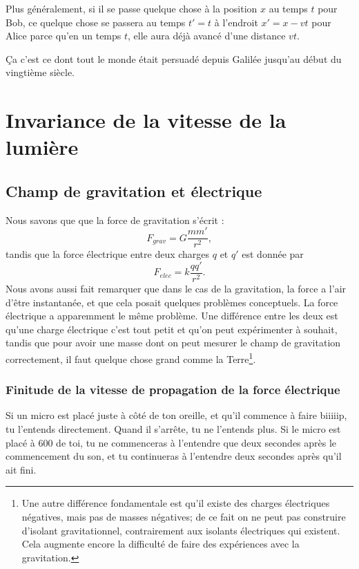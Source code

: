 Plus généralement, si il se passe quelque chose à la position \( x\) au temps \( t\) pour Bob, ce quelque chose se passera au temps \( t'=t\) à l'endroit \( x'=x-vt\) pour Alice parce qu'en un temps \( t\), elle aura déjà avancé d'une distance \( vt\).

Ça c'est ce dont tout le monde était persuadé depuis Galilée jusqu'au début du vingtième siècle.

%
\section{Invariance de la vitesse de la lumière}
%

\subsection{Champ de gravitation et électrique}

Nous savons que que la force de gravitation s'écrit :
\[
	F_{grav}=G\frac{ mm' }{ r^2 },
\]
tandis que la force électrique entre deux charges \( q\) et \( q'\) est donnée par
\begin{equation}	\label{EqRappelFelec}
	F_{elec}=k\frac{ qq' }{ r^2 }.
\end{equation}
Nous avons aussi fait remarquer que dans le cas de la gravitation, la force a l'air d'être instantanée, et que cela posait quelques problèmes conceptuels. La force électrique a apparemment le même problème. Une différence entre les deux est qu'une charge électrique c'est tout petit et qu'on peut expérimenter à souhait, tandis que pour avoir une masse dont on peut mesurer le champ de gravitation correctement, il faut quelque chose grand comme la Terre\footnote{Une autre différence fondamentale est qu'il existe des charges électriques négatives, mais pas de masses négatives; de ce fait on ne peut pas construire d'isolant gravitationnel, contrairement aux isolants électriques qui existent. Cela augmente encore la difficulté de faire des expériences avec la gravitation.}.

\subsubsection{Finitude de la vitesse de propagation de la force électrique}

Si un micro est placé juste à côté de ton oreille, et qu'il commence à faire biiiiip, tu l'entends directement. Quand il s'arrête, tu ne l'entends plus. Si le micro est placé à \unit{600}{\meter} de toi, tu ne commenceras à l'entendre que deux secondes après le commencement du son, et tu continueras à l'entendre deux secondes après qu'il ait fini.

